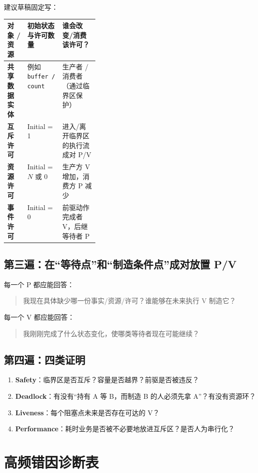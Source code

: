 \documentclass[11pt,a4paper]{ctexart}
\newcommand{\kw}[1]{\textbf{#1}}
\newcommand{\code}[1]{\texttt{#1}}
\begin{document}
建议草稿固定写：

\begingroup
\small
\renewcommand{\arraystretch}{1.25}
\setlength{\tabcolsep}{6pt}
\begin{tabularx}{\linewidth}{>{\bfseries}p{0.22\linewidth} X X}
\toprule
对象 / 资源 & 初始状态与许可数量 & 谁会改变/消费该许可？\\
\midrule
共享数据实体 & 例如 \code{buffer / count} & 生产者 / 消费者（通过临界区保护）\\
互斥许可 & Initial = 1 & 进入/离开临界区的执行流成对 P/V\\
资源许可 & Initial = $N$ 或 $0$ & 生产方 V 增加，消费方 P 减少\\
事件许可 & Initial = 0 & 前驱动作完成者 V，后继等待者 P\\
\bottomrule
\end{tabularx}
\endgroup

\subsection{第三遍：在“等待点”和“制造条件点”成对放置 P/V}

每一个 P 都应能回答：
\begin{quote}
我现在具体缺少哪一份事实/资源/许可？谁能够在未来执行 V 制造它？
\end{quote}
每一个 V 都应能回答：
\begin{quote}
我刚刚完成了什么状态变化，使哪类等待者现在可能继续？
\end{quote}

\subsection{第四遍：四类证明}

\begin{enumerate}
\item \kw{Safety}：临界区是否互斥？容量是否越界？前驱是否被违反？
\item \kw{Deadlock}：有没有“持有 A 等 B，而制造 B 的人必须先拿 A”？有没有资源环？
\item \kw{Liveness}：每个阻塞点未来是否存在可达的 V？
\item \kw{Performance}：耗时业务是否被不必要地放进互斥区？是否人为串行化？
\end{enumerate}

\section{高频错因诊断表}
\end{document}
